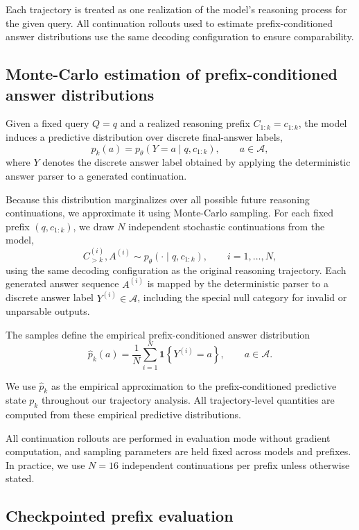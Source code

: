 \documentclass{article}
\begin{document}
Each trajectory is treated as one realization of the model's reasoning process for the given query. All continuation rollouts used to estimate prefix-conditioned answer distributions use the same decoding configuration to ensure comparability.

\subsection{Monte-Carlo estimation of prefix-conditioned answer distributions}
\label{subsec:mc_answer_distribution}

Given a fixed query \(Q=q\) and a realized reasoning prefix \(C_{1:k}=c_{1:k}\), the model induces a predictive distribution over discrete final-answer labels,
\[
p_k(a) 
=
p_\theta(Y=a \mid q,c_{1:k}),
\qquad a\in\mathcal{A},
\]
where \(Y\) denotes the discrete answer label obtained by applying the deterministic answer parser to a generated continuation.

Because this distribution marginalizes over all possible future reasoning continuations, we approximate it using Monte-Carlo sampling. For each fixed prefix \((q,c_{1:k})\), we draw \(N\) independent stochastic continuations from the model,
\[
C^{(i)}_{>k}, A^{(i)}
\sim
p_\theta(\cdot \mid q,c_{1:k}),
\qquad i=1,\dots,N,
\]
using the same decoding configuration as the original reasoning trajectory. Each generated answer sequence \(A^{(i)}\) is mapped by the deterministic parser to a discrete answer label \(Y^{(i)}\in\mathcal{A}\), including the special null category for invalid or unparsable outputs.

The samples define the empirical prefix-conditioned answer distribution
\[
\widehat{p}_k(a)
=
\frac{1}{N}
\sum_{i=1}^{N}
\mathbf{1}\!\left\{Y^{(i)}=a\right\},
\qquad a\in\mathcal{A}.
\]

We use \(\widehat{p}_k\) as the empirical approximation to the prefix-conditioned predictive state \(p_k\) throughout our trajectory analysis. All trajectory-level quantities are computed from these empirical predictive distributions.

All continuation rollouts are performed in evaluation mode without gradient computation, and sampling parameters are held fixed across models and prefixes. In practice, we use \(N=16\) independent continuations per prefix unless otherwise stated.

\subsection{Checkpointed prefix evaluation}
\label{subsec:checkpointed_prefix_evaluation}
\end{document}
